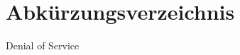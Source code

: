 

\chapter*{Abkürzungsverzeichnis}
\begin{acronym}[abbreviations]
 {Denial of Service}
\end{acronym}


